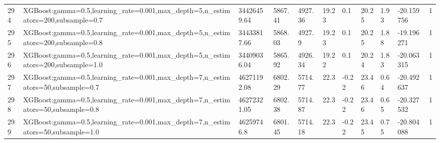 \begin{longtable}{C{0.8cm} L{2cm} C{1.15cm} C{1.15cm} C{1.15cm} C{1.15cm} C{0.85cm} C{1.25cm} C{1.2cm} C{1.5cm} C{1.0cm}}
294 & XGBoost:\newline gamma=0.5,\newline learning\_rate=0.001,\newline max\_depth=5,\newline n\_estimators=200,\newline subsample=0.7 & 34426459.64 & 5867.41 & 4927.36 & 19.23 & 0.1 & 20.25 & 1.93 & -20.159756 & 1 \\
295 & XGBoost:\newline gamma=0.5,\newline learning\_rate=0.001,\newline max\_depth=5,\newline n\_estimators=200,\newline subsample=0.8 & 34433817.66 & 5868.03 & 4927.9 & 19.23 & 0.1 & 20.25 & 1.88 & -19.196271 & 1 \\
296 & XGBoost:\newline gamma=0.5,\newline learning\_rate=0.001,\newline max\_depth=5,\newline n\_estimators=200,\newline subsample=1.0 & 34409036.04 & 5865.92 & 4926.34 & 19.22 & 0.1 & 20.24 & 1.83 & -20.063315 & 1 \\
297 & XGBoost:\newline gamma=0.5,\newline learning\_rate=0.001,\newline max\_depth=7,\newline n\_estimators=50,\newline subsample=0.7 & 46271192.08 & 6802.29 & 5714.77 & 22.3 & -0.22 & 23.46 & 0.64 & -20.492637 & 1 \\
298 & XGBoost:\newline gamma=0.5,\newline learning\_rate=0.001,\newline max\_depth=7,\newline n\_estimators=50,\newline subsample=0.8 & 46272321.05 & 6802.38 & 5714.87 & 22.3 & -0.22 & 23.46 & 0.65 & -20.327532 & 1 \\
299 & XGBoost:\newline gamma=0.5,\newline learning\_rate=0.001,\newline max\_depth=7,\newline n\_estimators=50,\newline subsample=1.0 & 46259746.8 & 6801.45 & 5714.18 & 22.3 & -0.22 & 23.45 & 0.75 & -20.804088 & 1 \\

\end{longtable}
